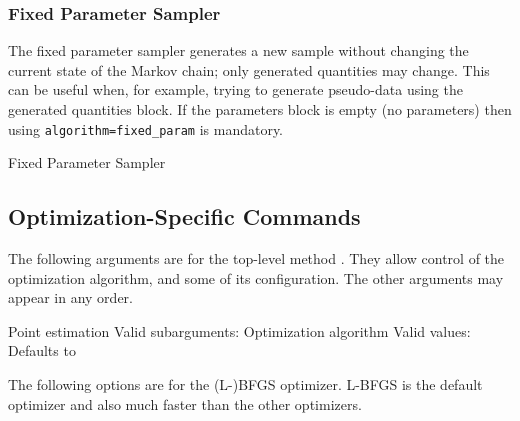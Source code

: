 \subsubsection{Fixed Parameter Sampler}

The fixed parameter sampler generates a new sample without changing
the current state of the Markov chain; only generated quantities may
change.  This can be useful when, for example, trying to generate pseudo-data
using the generated quantities block. If the parameters block is empty (no parameters) then using {\tt algorithm=fixed\_param} is mandatory.
%
\begin{description}
        {Fixed Parameter Sampler}
\end{description}

\subsection{Optimization-Specific Commands}

The following arguments are for the top-level method .
They allow control of the optimization algorithm, and some of its
configuration.  The other arguments may appear in any order.

\begin{description}
%
    {Point estimation}
    {Valid subarguments: }
%
      {Optimization algorithm}
      {Valid values: \  }
      {Defaults to }
\end{description}
%
The following options are for the (L-)BFGS optimizer. L-BFGS is the default
optimizer and also much faster than the other optimizers.


